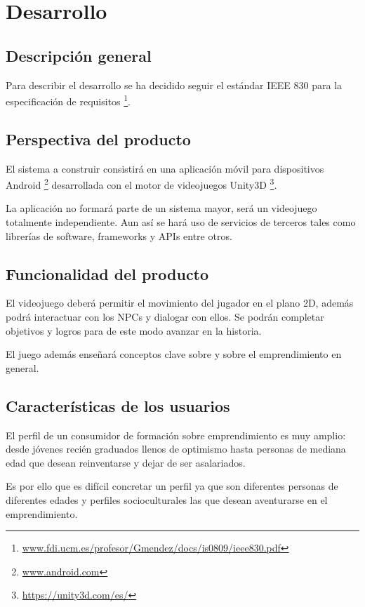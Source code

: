 \chapter{Desarrollo}

\section{Descripción general}

Para describir el desarrollo se ha decidido seguir el estándar IEEE 830 para la especificación de requisitos \footnote{\url{www.fdi.ucm.es/profesor/Gmendez/docs/is0809/ieee830.pdf}}.

\section{Perspectiva del producto}

El sistema a construir consistirá en una aplicación móvil para dispositivos Android \footnote{\url{www.android.com}} desarrollada con el motor de videojuegos Unity3D \footnote{\url{https://unity3d.com/es/}}. 

La aplicación no formará parte de un sistema mayor, será un videojuego totalmente independiente. Aun así se hará uso de servicios de terceros tales como librerías de software, frameworks y APIs entre otros.

\section{Funcionalidad del producto}

El videojuego deberá permitir el movimiento del jugador en el plano 2D, además podrá interactuar con los NPCs y dialogar con ellos. Se podrán completar objetivos y logros para de este modo avanzar en la historia.

El juego además enseñará conceptos clave sobre  y sobre el emprendimiento en general.

\section{Características de los usuarios}

El perfil de un consumidor de formación sobre emprendimiento es muy amplio: desde jóvenes recién graduados llenos de optimismo hasta personas de mediana edad que desean reinventarse y dejar de ser asalariados. 

Es por ello que es difícil concretar un perfil ya que son diferentes personas de diferentes edades y perfiles socioculturales las que desean aventurarse en el emprendimiento.

